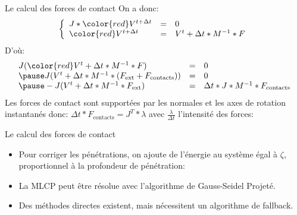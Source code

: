 \begin{frame}{Le calcul des forces de contact}
    On a donc:
    \[
        \left\{
        \begin{array}{lcl}
            J * \color{red}V^{t + \Delta t} & = & 0\\
            \color{red}V^{t + \Delta t}     & = & V^t + \Delta t * M^{-1} * F
        \end{array}
        \right.
    \]
    \pause
    D’où:
    \[
        \begin{array}{lcl}
            J ({\color{red}V^t + \Delta t * M^{-1} * F}) & = & 0\\
            \pause
            J (V^t + \Delta t * M^{-1} * (F_{\text{ext}} +
            F_{\text{contacts}})) & = & 0\\
            \pause
            -J(V^t + \Delta t * M^{-1} * F_{\text{ext}}) & = &  \Delta t * J * M^{-1} * F_{\text{contacts}}\\
        \end{array}
    \]
    \pause
    Les forces de contact sont supportées par les normales et les axes de
    rotation instantanés donc: $\Delta t * F_{\text{contacts}} = J^T * \lambda$ avec
    $\frac{\lambda}{\Delta t}$ l’intensité des forces:
    \pause
    \begin{center}
    \end{center}
\end{frame}

\begin{frame}{Le calcul des forces de contact}
    \begin{itemize}
        \item Pour corriger les pénétrations, on ajoute de l’énergie au système
            égal à $\zeta$, proportionnel à la profondeur de pénétration:
            \begin{center}
            \end{center}
            \pause
        \item La MLCP peut être résolue avec l’algorithme de Gauss-Seidel
            Projeté.
            \pause
        \item Des méthodes directes existent, mais nécessitent un algorithme de
            fallback.
    \end{itemize}
\end{frame}
